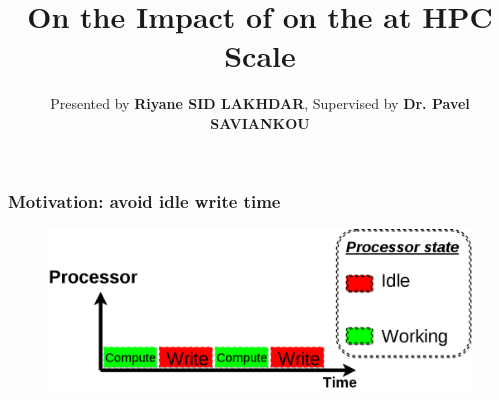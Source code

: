 \documentclass[slidestop,xcolor=dvipsnames, notes=hide]{beamer}
\title[On the Impact of \notationAIO\space on the \toolTargetSoftware\space at HPC Scale] %
{On the Impact of \notationAIO\space on the \toolTargetSoftware\space at HPC Scale}
\subtitle{Presented by \textbf{Riyane SID LAKHDAR}, Supervised by \textbf{Dr. Pavel SAVIANKOU}}
\author[SID LAKHDAR] %
{
}
\institute[JSC] %
{
	JSC \\
	Forschungszentrum Jülich GmbH
	Master of Computer Science at ENSIMAG/UGA Grenoble\\
	Specialization in Parallel Distributed Embedded Systems
}
\date[\today] %
\begin{document}
\maketitle















	\begin{frame}
		\frametitle{Motivation: avoid idle write time}
		\begin{figure}
			\center
			\includegraphics[width=1\textwidth, height=0.6\textheight]{images/internship_juelich_cubeRemapper_pattern.png}
		\end{figure}
	\end{frame}
\end{document}
